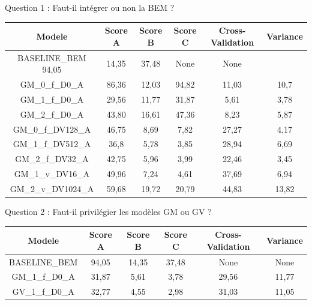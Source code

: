 \documentclass[
11pt,notheorems,hyperref={pdfauthor=whatever}
]{beamer}
\begin{document}
\begin{frame}{Question 1 : Faut-il intégrer ou non la BEM ?}
    \vspace{0.3cm}

    \small
        \begin{tabular}{|c|c|c|c|c|c|}
            \hline
            \textbf{Modele} & \textbf{Score A} & \textbf{Score B} & \textbf{Score C} & \textbf{Cross-Validation} & \textbf{Variance} \\
            \hline
            BASELINE\_BEM 94,05 & 14,35 & 37,48 & None & None\\
            \hline
            GM\_0\_f\_D0\_A & 86,36 & 12,03 & 94,82 & 11,03 & 10,7 \\
            GM\_1\_f\_D0\_A & 29,56 & 11,77 & 31,87 & 5,61 & 3,78 \\
            GM\_2\_f\_D0\_A & 43,80 & 16,61 & 47,36 & 8,23 & 5,87 \\
            \hline
            GM\_0\_f\_DV128\_A & 46,75 & 8,69 & 7,82 & 27,27 & 4,17 \\
            GM\_1\_f\_DV512\_A & 36,8 & 5,78 & 3,85 & 28,94 & 6,69 \\
            GM\_2\_f\_DV32\_A & 42,75 & 5,96 & 3,99 & 22,46 & 3,45 \\
            \hline
            GM\_1\_v\_DV16\_A & 49,96 & 7,24 & 4,61 & 37,69 & 6,94 \\
            GM\_2\_v\_DV1024\_A & 59,68 & 19,72 & 20,79 & 44,83 & 13,82 \\
            \hline
        \end{tabular}

    \vspace{0.3cm}
\end{frame}

\begin{frame}{Question 2 : Faut-il privilégier les modèles GM ou GV ?}
            \begin{tabular}{|c|c|c|c|c|c|}
                \hline
                \textbf{Modele} & \textbf{Score A} & \textbf{Score B} & \textbf{Score C} & \textbf{Cross-Validation} & \textbf{Variance} \\
                \hline
                BASELINE\_BEM &94,05 & 14,35 & 37,48 & None  & None   \\
                \hline    
                GM\_1\_f\_D0\_A & 31,87 & 5,61 & 3,78 & 29,56 & 11,77 \\
                GV\_1\_f\_D0\_A & 32,77 & 4,55 & 2,98 & 31,03 & 11,05 \\
                \hline
            \end{tabular}
\end{frame}
\end{document}

